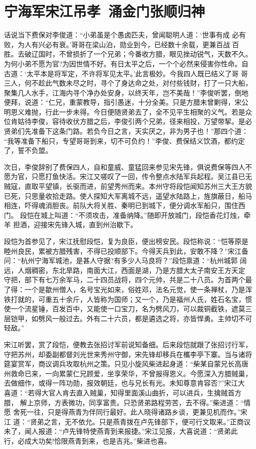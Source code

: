 \chapter{宁海军宋江吊孝~涌金门张顺归神}

话说当下费保对李俊道：“小弟虽是个愚卤匹夫，曾闻聪明人道：‘世事有成
必有败，为人有兴必有衰。’哥哥在梁山泊，勋业到今，已经数十余载，更兼百战
百胜。去破辽国时，不曾损折了一个兄弟；今番收方腊，眼见挫动锐气，天数不久。
为何小弟不愿为官?为因世情不好。有日太平之后，一个个必然来侵害你性命。自
古道：‘太平本是将军定，不许将军见太平。’此言极妙。今我四人既已结义了哥
哥三人，何不趁此气数未尽之时，寻个了身达命之处，对付些钱财，打了一只大船，
聚集几人水手，江海内寻个净办处安身，以终天年，岂不美哉！”李俊听罢，倒地
便拜，说道：“仁兄，重蒙教导，指引愚迷，十分全美。只是方腊未曾剿得，宋公
明恩义难抛，行此一步未得。今日便随贤弟去了，全不见平生相聚的义气。若是众
位肯姑待李俊，容待收伏方腊之后，李俊引两个兄弟，径来相投，万望带挈。是必
贤弟们先准备下这条门路。若负今日之言，天实厌之，非为男子也！”那四个道：
“我等准备下船只，专望哥哥到来，切不可负约！”李俊、费保结义饮酒，都约定
了，誓不负盟。

次日，李俊辞别了费保四人，自和童威、童猛回来参见宋先锋，俱说费保等四人不
愿为官，只愿打鱼快活。宋江又嗟叹了一回，传令整点水陆军兵起程。吴江县已无
贼寇，直取平望镇，长驱而进，前望秀州而来。本州守将段恺闻知苏州三大王方貌
已死，只思量收拾走路。使人探知大军离城不远，遥望水陆路上，旌旗蔽日，船马
相连，吓得魂消胆丧。前队大将关胜、秦明已到城下，便分调水军船只，围住西门。
段恺在城上叫道：“不须攻击，准备纳降。”随即开放城门，段恺香花灯烛，牵羊
担酒，迎接宋先锋入城，直到州治歇下。

段恺为首参见了，宋江抚慰段恺，复为良臣，便出榜安民。段恺称说：“恺等原是
睦州良民，累被方腊残害，不得已投顺部下。今得天兵到此，安敢不降？”宋江备
问：“杭州宁海军城池，是甚人守据?有多少人马良将？”段恺禀道：“杭州城郭
阔远，人烟稠密，东北旱路，南面大江，西面是湖，乃是方腊大太子南安王方天定
守把，部下有七万余军马，二十四员战将，四个元帅，共是二十八员。为首两个最
了得：一个是歙州僧人，名号宝光如来，俗姓邓，法名元觉，使一条禅杖，乃是浑
铁打就的，可重五十余斤，人皆称为国师；又一个，乃是福州人氏，姓石名宝，惯
使一个流星锤，百发百中，又能使一口宝刀，名为劈风刀，可以裁铜截铁，遮莫三
层铠甲，如劈风一般过去。外有二十六员，都是遴选之将，亦皆悍勇。主帅切不可
轻敌。”

宋江听罢，赏了段恺，便教去张招讨军前说知备细。后来段恺就跟了张招讨行军，
守把苏州，却委副都督刘光世来秀州守御，宋先锋却移兵在欈李亭下寨。当与诸将
筵宴赏军，商议调兵攻取杭州之策。只见小旋风柴进起身道：“柴某自蒙兄长高唐
州救命已来，一向累蒙仁兄顾爱，坐享荣华，不曾报得恩义。今愿深入方腊贼巢，
去做细作，或得一阵功勋，报效朝廷，也与兄长有光。未知尊意肯容否?”宋江大
喜道：“若得大官人肯去直入贼巢，知得里面溪山曲折，可以进兵，生擒贼首方腊，
解上京师，方表微功，同享富贵。只恐贤弟路程劳苦，去不得。”柴进道：“情愿
舍死一往，只是得燕青为伴同行最好。此人晓得诸路乡谈，更兼见机而作。”宋江
道：“贤弟之言，无不依允。只是燕青拨在卢先锋部下，便可行文取来。”正商议
未了，闻人报道：“卢先锋特使燕青到来报捷。”宋江见报，大喜说道：“贤弟此
行，必成大功矣!恰限燕青到来，也是吉兆。”柴进也喜。

